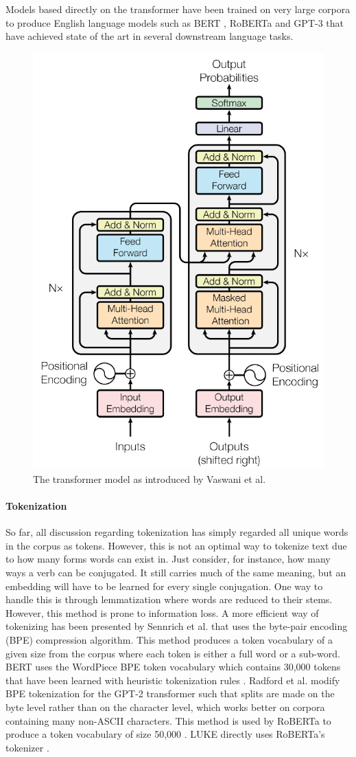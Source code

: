 \documentclass[main.tex]{subfiles}
\begin{document}
Models based directly on the transformer have been trained on very large corpora to produce English language models such as BERT \cite{devlin2019bert}, RoBERTa \cite{liu2019roberta} and GPT-3 \cite{brown2020language} that have achieved state of the art in several downstream language tasks.
\begin{figure}[H]
    \centering
    \includegraphics[width=0.3\linewidth]{imgs/transformer}
    \caption{The transformer model as introduced by Vaswani et al. \cite{vaswani2017att}}
    \label{fig:transformer}
\end{figure}\noindent

\paragraph{Tokenization}
So far, all discussion regarding tokenization has simply regarded all unique words in the corpus as tokens.
However, this is not an optimal way to tokenize text due to how many forms words can exist in.
Just consider, for instance, how many ways a verb can be conjugated.
It still carries much of the same meaning, but an embedding will have to be learned for every single conjugation.
One way to handle this is through lemmatization where words are reduced to their stems.
However, this method is prone to information loss.
A more efficient way of tokenizing has been presented by Sennrich et al. \cite{sennrich-etal-2016-neural} that uses the byte-pair encoding (BPE) compression algorithm.
This method produces a token vocabulary of a given size from the corpus where each token is either a full word or a sub-word.
BERT uses the WordPiece BPE token vocabulary which contains 30,000 tokens that have been learned with heuristic tokenization rules \cite{wu2016tokenize} \cite{devlin2019bert}.
Radford et al. \cite{Radford2019gpt2} modify BPE tokenization for the GPT-2 transformer such that splits are made on the byte level rather than on the character level, which works better on corpora containing many non-ASCII characters.
This method is used by RoBERTa to produce a token vocabulary of size 50,000 \cite{liu2019roberta}.
LUKE directly uses RoBERTa's tokenizer \cite{yamada2020luke}.
\end{document}
